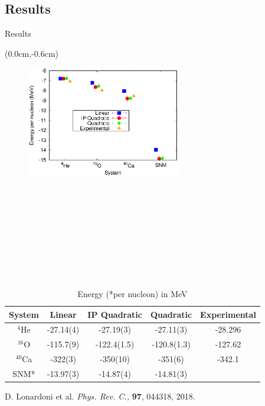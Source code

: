 \documentclass{beamer}
\begin{document}
\subsection{Results}
\begin{frame}{Results}
\begin{textblock*}{\textwidth}(0.0cm,-0.6cm) %
\begin{figure}[h]
   \centering
   \includegraphics[width=0.6\textwidth]{energy.eps}
\end{figure}
\end{textblock*}
~\\~\\~\\~\\~\\~\\~\\~\\
\tiny
\begin{table}[htb]
\centering
\caption[]{Energy (*per nucleon) in MeV}
\begin{tabular}{ccccc}
\hline\hline
System & Linear & IP Quadratic & Quadratic & Experimental\\
\hline
${}^{4}${He}   & -27.14(4) & -27.19(3)    & -27.11(3)    & -28.296   \\
${}^{16}${O}   & -115.7(9) & -122.4(1.5)  & -120.8(1.3)  & -127.62   \\
${}^{40}${Ca}  & -322(3)   & -350(10)     & -351(6)      & -342.1    \\
SNM*           & -13.97(3) & -14.87(4)    & -14.81(3)    &           \\
\hline\hline
\end{tabular}
\label{tab:psi2}
\end{table}
{\tiny D. Lonardoni et al. \textit{Phys. Rev. C.,} \textbf{97}, 044318, 2018.}
\end{frame}
\end{document}

